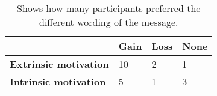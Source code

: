 \begin{table}[ht]
\begin{center}
\begin{tabular}{ |  m{10em} | m{1.5cm}| m{1.5cm} | m{1.5cm} |} 
\hline
  &  \textbf{Gain} & \textbf{Loss} & \textbf{None} \\ 
\hline
\textbf{Extrinsic motivation} & 10 & 2 & 1  \\ 
\hline
\textbf{Intrinsic motivation} & 5 & 1 & 3  \\ 
\hline
\end{tabular}
\caption{\label{tab:table-name} Shows how many participants preferred the different wording of the message.}
\end{center}
\end{table}


\begin{comment}
\begin{table}[ht]
\centering
\begin{tabular}{lllll}
\cline{2-4}
\multicolumn{1}{l|}{}                               & \multicolumn{1}{l|}{\textbf{Gain}} & \multicolumn{1}{l|}{\textbf{Loss}} & \multicolumn{1}{l|}{\textbf{None}} &  \\ \cline{1-4}
\multicolumn{1}{|l|}{\textbf{Extrinsic motivation}} & \multicolumn{1}{c|}{10}            & \multicolumn{1}{c|}{2} & \multicolumn{1}{c|}{1} &  \\ \cline{1-4}\multicolumn{1}{|l|}{\textbf{Intrinsic motivation}} & \multicolumn{1}{c|}{5} & \multicolumn{1}{c|}{1} & \multicolumn{1}{c|}{3} &  \\ \cline{1-4}
&&&& 
\end{tabular}
\caption{\label{tab:table-name} Shows how many participants preferred the different wording of the message.}
\end{table}
\end{comment}











